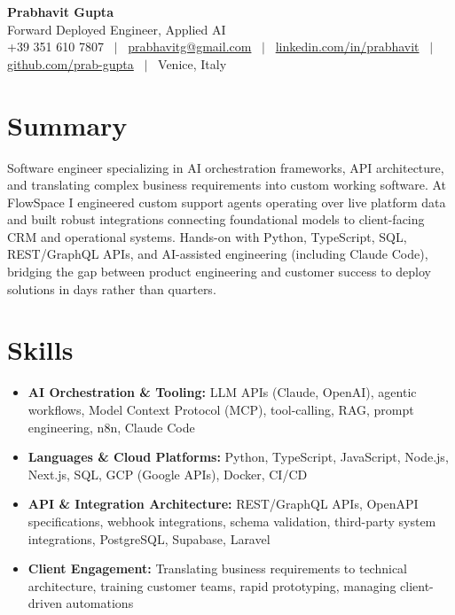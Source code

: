 \documentclass[a4paper,10pt]{article}
\begin{document}
\begin{center}
 {\Huge\bfseries Prabhavit Gupta}\\[3pt]
 {\color{accent}\large Forward Deployed Engineer, Applied AI}\\[6pt]
 {\footnotesize +39 351 610 7807 ~$\vert$~
 \href{mailto:prabhavitg@gmail.com}{prabhavitg@gmail.com} ~$\vert$~
 \href{https://www.linkedin.com/in/prabhavit/}{linkedin.com/in/prabhavit} ~$\vert$~
 \href{https://github.com/prab-gupta}{github.com/prab-gupta} ~$\vert$~
 Venice, Italy}
\end{center}
\vspace{2pt}

\section{Summary}
Software engineer specializing in AI orchestration frameworks, API architecture, and translating complex business requirements into custom working software. At FlowSpace I engineered custom support agents operating over live platform data and built robust integrations connecting foundational models to client-facing CRM and operational systems. Hands-on with Python, TypeScript, SQL, REST/GraphQL APIs, and AI-assisted engineering (including Claude Code), bridging the gap between product engineering and customer success to deploy solutions in days rather than quarters.

\section{Skills}
\begin{itemize}
 \item \textbf{AI Orchestration \& Tooling:} LLM APIs (Claude, OpenAI), agentic workflows, Model Context Protocol (MCP), tool-calling, RAG, prompt engineering, n8n, Claude Code
 \item \textbf{Languages \& Cloud Platforms:} Python, TypeScript, JavaScript, Node.js, Next.js, SQL, GCP (Google APIs), Docker, CI/CD
 \item \textbf{API \& Integration Architecture:} REST/GraphQL APIs, OpenAPI specifications, webhook integrations, schema validation, third-party system integrations, PostgreSQL, Supabase, Laravel
 \item \textbf{Client Engagement:} Translating business requirements to technical architecture, training customer teams, rapid prototyping, managing client-driven automations
\end{itemize}
\end{document}
